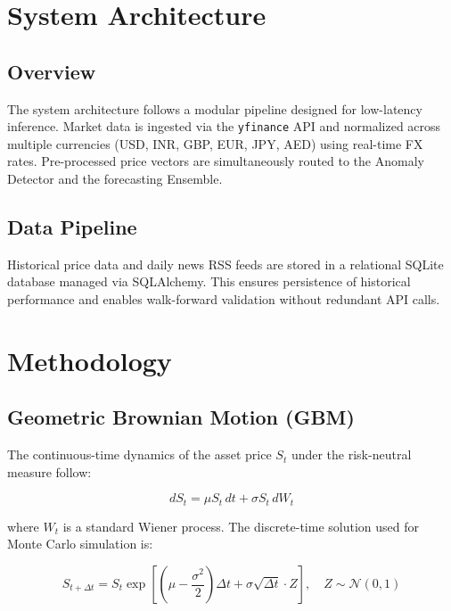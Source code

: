 \documentclass[conference]{IEEEtran}
\begin{document}
\section{System Architecture}

\subsection{Overview}
The system architecture follows a modular pipeline designed for 
low-latency inference. Market data is ingested via the \texttt{yfinance} 
API and normalized across multiple currencies (USD, INR, GBP, EUR, 
JPY, AED) using real-time FX rates. Pre-processed price vectors are 
simultaneously routed to the Anomaly Detector and the forecasting 
Ensemble.

\subsection{Data Pipeline}
Historical price data and daily news RSS feeds are stored in a 
relational SQLite database managed via SQLAlchemy. This ensures 
persistence of historical performance and enables walk-forward 
validation without redundant API calls.

\section{Methodology}
\label{sec:methodology}

\subsection{Geometric Brownian Motion (GBM)}

The continuous-time dynamics of the asset price $S_t$ under the
risk-neutral measure follow:

\begin{equation}
    dS_t = \mu S_t \, dt + \sigma S_t \, dW_t
\end{equation}

where $W_t$ is a standard Wiener process. The discrete-time solution
used for Monte Carlo simulation is:

\begin{equation}
    S_{t+\Delta t} = S_t \exp\left[
        \left(\mu - \frac{\sigma^2}{2}\right) \Delta t
        + \sigma \sqrt{\Delta t} \cdot Z
    \right], \quad Z \sim \mathcal{N}(0, 1)
\end{equation}
\end{document}
